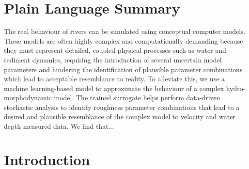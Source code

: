 \documentclass[draft,linenumbers,onecolumn]{agujournal2019} %
\begin{document}
\section*{Plain Language Summary}

The real behaviour of rivers can be simulated using conceptual computer models. These models are often highly complex and computationally demanding because they must represent detailed, coupled physical processes such as water and sediment dynamics, requiring the introduction of several uncertain model parameters and hindering the identification of plausible parameter combinations which lead to acceptable resemblance to reality. To alleviate this, we use a machine learning-based model to approximate the behaviour of a complex  hydro-morphodynamic model. The trained surrogate helps perform data-driven stochastic analysis to identify roughness parameter combinations that lead to a desired and plausible resemblance of the complex model to velocity and water depth measured data. We find that...   


\section{Introduction}
\end{document}
